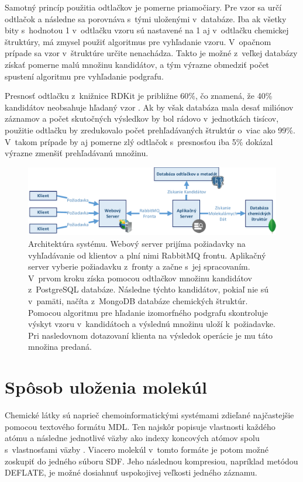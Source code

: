 \documentclass[slovak]{ExcelAtFIT} %
\begin{document}
Samotný princíp použitia odtlačkov je pomerne priamočiary. Pre vzor sa určí odtlačok a následne sa porovnáva s~tými uloženými v~databáze. Iba ak všetky bity s~hodnotou 1 v~odtlačku vzoru sú nastavené na 1 aj v~odtlačku chemickej štruktúry, má zmysel použiť algoritmus pre vyhľadanie vzoru. V~opačnom prípade sa vzor v~štruktúre určite nenachádza. Takto je možné z~veľkej databázy získať pomerne malú množinu kandidátov, a tým výrazne obmedziť počet spustení algoritmu pre vyhľadanie podgrafu.

Presnosť odtlačku z~knižnice RDKit je približne 60\si{\percent}, čo znamená, že 40\si{\percent} kandidátov neobsahuje hľadaný vzor \cite{substruct_acc}. Ak by však databáza mala desať mi\-li\-ó\-nov záznamov a počet skutočných výsledkov by bol rádovo v~jednotkách tisícov, použitie odtlačku by zredukovalo počet prehľadávaných štruktúr o~viac ako 99\si{\percent}. V~takom prípade by aj pomerne zlý odtlačok s~presnosťou iba 5\si{\percent} dokázal výrazne zmenšiť prehľadávanú množinu.

\begin{figure}[!htb]
	\centering
	\includegraphics[width=1\linewidth]{images/system.pdf}
	\caption{Architektúra systému. Webový server prijíma požiadavky na vyhľadávanie od klientov a plní nimi RabbitMQ frontu. Aplikačný server vyberie požiadavku z~fronty a začne s~jej spracovaním. V~prvom kroku získa pomocou odtlačkov množinu kandidátov z~PostgreSQL databáze. Následne týchto kandidátov, pokiaľ nie sú v~pamäti, načíta z~MongoDB databáze chemických štruktúr. Pomocou algoritmu pre hľadanie izomorfného podgrafu skontroluje výskyt vzoru v~kandidátoch a výslednú množinu uloží k~požiadavke. Pri nasledovnom dotazovaní klienta na výsledok operácie je mu táto množina predaná.}
	\label{fig:system}
\end{figure}

\section{Spôsob uloženia molekúl}
\label{sec:storage}
Chemické látky sú naprieč chemoinformatickými sy\-sté\-mami zdieľané najčastejšie pomocou textového for\-má\-tu MDL. Ten najskôr popisuje vlastnosti každého atómu a následne jednotlivé väzby ako indexy koncových atómov spolu s~vlastnosťami väzby \cite{mdl}. Viacero molekúl v~tomto formáte je potom možné zoskupiť do jedného súboru SDF. Jeho následnou kompresiou, napríklad metódou DEFLATE, je možné dosiahnuť uspokojivej veľkosti jedného záznamu. 
\end{document}
